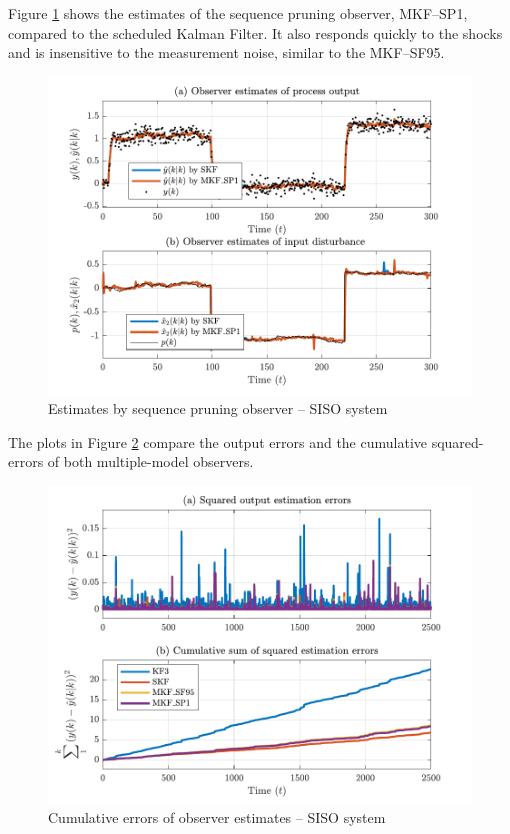 Figure \ref{fig:rod-obs-sim1-yest-1-SP} shows the estimates of the sequence pruning observer, MKF--SP1, compared to the scheduled Kalman Filter.  It also responds quickly to the shocks and is insensitive to the measurement noise, similar to the MKF--SF95.
\begin{figure}[htp]
	\centering
	\includegraphics[width=13cm]{images/rod_obs_sim1_all_seed_y_est1_SP1.pdf}
	\caption{Estimates by sequence pruning observer – SISO system}
	\label{fig:rod-obs-sim1-yest-1-SP}
\end{figure}


The plots in Figure \ref{fig:rod-obs-sim1-cum-err-y1-all} compare the output errors and the cumulative squared-errors of both multiple-model observers.
\begin{figure}[htp]
	\centering
	\includegraphics[width=13cm]{images/rod_obs_sim1_all_seed_cum_err_y1.pdf}
	\caption{Cumulative errors of observer estimates – SISO system}
	\label{fig:rod-obs-sim1-cum-err-y1-all}
\end{figure}

